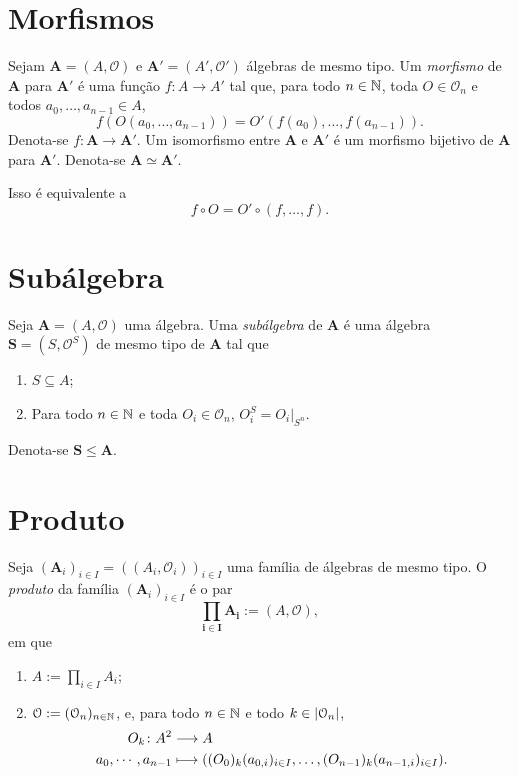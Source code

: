 \section{Morfismos}

\begin{definition}
Sejam $\bm A = (A,\mathcal O)$ e $\bm A' = (A',\mathcal O')$ álgebras de mesmo tipo. Um \emph{morfismo} de $\bm A$ para $\bm A'$ é uma função $f\colon A \to A'$ tal que, para todo $n \in \mathbb{N}$, toda $O \in \mathcal O_n$ e todos $a_0,\ldots,a_{n-1} \in A$,
	\begin{equation*}
		f(O(a_0,\ldots,a_{n-1})) = O'(f(a_0),\ldots,f(a_{n-1})).
	\end{equation*}
Denota-se $f\colon \bm A \to \bm A'$. Um isomorfismo entre $\bm A$ e $\bm A'$ é um morfismo bijetivo de $\bm A$ para $\bm A'$. Denota-se $\bm A \simeq \bm A'$.
\end{definition}

Isso é equivalente a
	\begin{equation*}
		f \circ O = O' \circ (f,\ldots,f).
	\end{equation*}

\section{Subálgebra}

\begin{definition}
Seja $\bm A = (A,\mathcal O)$ uma álgebra. Uma \emph{subálgebra} de $\bm A$ é uma álgebra $\bm S = (S,\mathcal O^S)$ de mesmo tipo de $\bm A$ tal que
	\begin{enumerate}
		\item $S \subseteq A$;
		\item Para todo $n \in \mathbb{N}$ e toda $O_i \in \mathcal O_n$, $O_i^S = O_i|_{S^n}$.
	\end{enumerate}
Denota-se $\bm S \leq \bm A$.
\end{definition}

\section{Produto}

\begin{definition}
Seja $(\bm A_i)_{i \in I} = ((A_i,\mathcal O_i))_{i \in I}$ uma família de álgebras de mesmo tipo. O \emph{produto} da família $(\bm A_i)_{i \in I}$ é o par
	\begin{equation*}
		\bm{\prod_{i \in I} A_i} := \left(A, \mathcal O \right),
	\end{equation*}
em que
	\begin{enumerate}
		\item $A := \prod_{i \in I} A_i$;
		\item $\mathcal O := (\mathcal O_n)_{n \in \mathbb{N}}$, e, para todo $n \in \mathbb{N}$ e todo $k \in \left\lvert{\mathcal O_n}\right\rvert$,
	\begin{align*}
		{O_k}\colon {A^2} &\longrightarrow {A} \\{a_0,\cdots, a_{n-1}} &\longmapsto ((O_0)_k(a_{0,i})_{i \in I},\ldots,(O_{n-1})_k(a_{n-1,i})_{i \in I}).
	\end{align*}
	\end{enumerate}
\end{definition}

